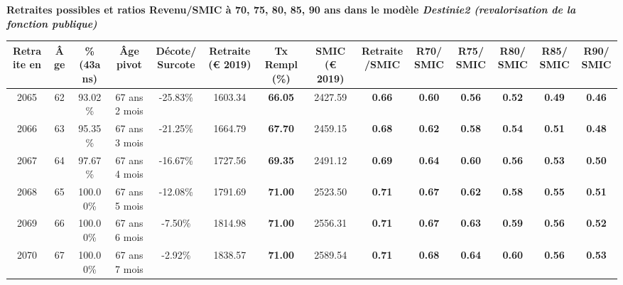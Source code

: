  \vspace{0.1cm} 
{\bf \noindent Retraites possibles et ratios Revenu/SMIC à 70, 75, 80, 85, 90 ans dans le modèle \emph{Destinie2 (revalorisation de la fonction publique)}}  
 
\begin{adjustbox}{max width=\textwidth} 
\begin{tabular}[htb]{|c|c||c|c|c||c|c||c|c||c|c|c|c|c|} 
\hline 
 Retraite en &  Âge &  \%(43ans) &  Âge pivot &  Décote/Surcote &  Retraite (\euro{} 2019) &  Tx Rempl(\%) &  SMIC (\euro{} 2019) &  Retraite/SMIC &  R70/SMIC &  R75/SMIC &  R80/SMIC &  R85/SMIC &  R90/SMIC \\ 
\hline \hline 
 2065 &  62 &  93.02\% &  67 ans 2 mois &  -25.83\% &  1603.34 &  {\bf 66.05} &  2427.59 &  {\bf {\color{red} 0.66}} &  {\bf {\color{red} 0.60}} &  {\bf {\color{red} 0.56}} &  {\bf {\color{red} 0.52}} &  {\bf {\color{red} 0.49}} &  {\bf {\color{red} 0.46}} \\ 
\hline 
 2066 &  63 &  95.35\% &  67 ans 3 mois &  -21.25\% &  1664.79 &  {\bf 67.70} &  2459.15 &  {\bf {\color{red} 0.68}} &  {\bf {\color{red} 0.62}} &  {\bf {\color{red} 0.58}} &  {\bf {\color{red} 0.54}} &  {\bf {\color{red} 0.51}} &  {\bf {\color{red} 0.48}} \\ 
\hline 
 2067 &  64 &  97.67\% &  67 ans 4 mois &  -16.67\% &  1727.56 &  {\bf 69.35} &  2491.12 &  {\bf {\color{red} 0.69}} &  {\bf {\color{red} 0.64}} &  {\bf {\color{red} 0.60}} &  {\bf {\color{red} 0.56}} &  {\bf {\color{red} 0.53}} &  {\bf {\color{red} 0.50}} \\ 
\hline 
 2068 &  65 &  100.00\% &  67 ans 5 mois &  -12.08\% &  1791.69 &  {\bf 71.00} &  2523.50 &  {\bf {\color{red} 0.71}} &  {\bf {\color{red} 0.67}} &  {\bf {\color{red} 0.62}} &  {\bf {\color{red} 0.58}} &  {\bf {\color{red} 0.55}} &  {\bf {\color{red} 0.51}} \\ 
\hline 
 2069 &  66 &  100.00\% &  67 ans 6 mois &  -7.50\% &  1814.98 &  {\bf 71.00} &  2556.31 &  {\bf {\color{red} 0.71}} &  {\bf {\color{red} 0.67}} &  {\bf {\color{red} 0.63}} &  {\bf {\color{red} 0.59}} &  {\bf {\color{red} 0.56}} &  {\bf {\color{red} 0.52}} \\ 
\hline 
 2070 &  67 &  100.00\% &  67 ans 7 mois &  -2.92\% &  1838.57 &  {\bf 71.00} &  2589.54 &  {\bf {\color{red} 0.71}} &  {\bf {\color{red} 0.68}} &  {\bf {\color{red} 0.64}} &  {\bf {\color{red} 0.60}} &  {\bf {\color{red} 0.56}} &  {\bf {\color{red} 0.53}} \\ 
\hline 
\hline 
\end{tabular} 
\end{adjustbox} 
 
